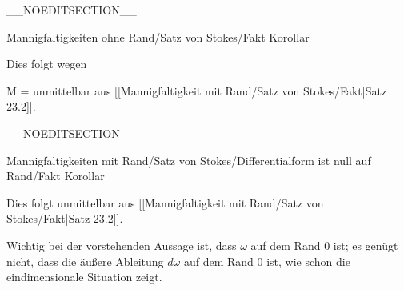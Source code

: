 __NOEDITSECTION__

{Mannigfaltigkeiten ohne Rand/Satz von Stokes/Fakt}
{Korollar}
{}
{

\faktzusatz {}
\faktzusatz {}

}
{

Dies folgt wegen

\mavergleichskette
{\vergleichskette
{ \partial M
}
{ = }{ \emptyset
}
{  }{
}
{    }{
}
{   }{
}
}
{}{}{}
unmittelbar aus
[[Mannigfaltigkeit mit Rand/Satz von Stokes/Fakt|Satz 23.2]].

}

__NOEDITSECTION__

{Mannigfaltigkeiten mit Rand/Satz von Stokes/Differentialform ist null auf Rand/Fakt}
{Korollar}
{}
{

\faktzusatz {}
\faktzusatz {}

}
{

Dies folgt unmittelbar aus
[[Mannigfaltigkeit mit Rand/Satz von Stokes/Fakt|Satz 23.2]].

}

Wichtig bei der vorstehenden Aussage ist, dass $\omega$ auf dem Rand $0$ ist; es genügt nicht, dass die äußere Ableitung $d\omega$ auf dem Rand $0$ ist, wie schon die eindimensionale Situation zeigt.

